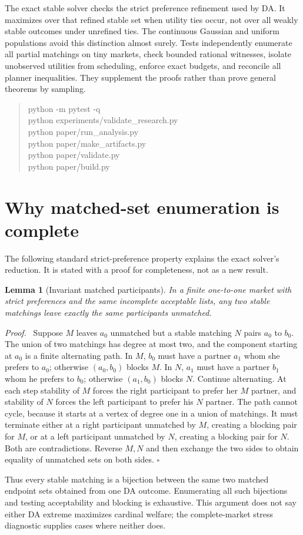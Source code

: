 \documentclass[11pt,a4paper]{article}
\newtheorem{lemma}{Lemma}
\newenvironment{proof}{\par\noindent\textit{Proof.}\ }{\hfill$\square$\par}
\begin{document}
The exact stable solver checks the strict preference refinement used by DA. It maximizes over that refined stable set when utility ties occur, not over all weakly stable outcomes under unrefined ties. The continuous Gaussian and uniform populations avoid this distinction almost surely. Tests independently enumerate all partial matchings on tiny markets, check bounded rational witnesses, isolate unobserved utilities from scheduling, enforce exact budgets, and reconcile all planner inequalities. They supplement the proofs rather than prove general theorems by sampling.

\begin{quote}\small\ttfamily
python -m pytest -q\\
python experiments/validate\_research.py\\
python paper/run\_analysis.py\\
python paper/make\_artifacts.py\\
python paper/validate.py\\
python paper/build.py
\end{quote}

\section{Why matched-set enumeration is complete}\label{app:matched}
The following standard strict-preference property explains the exact solver's
reduction. It is stated with a proof for completeness, not as a new result.
\begin{lemma}[Invariant matched participants]
In a finite one-to-one market with strict preferences and the same incomplete
acceptable lists, any two stable matchings leave exactly the same participants
unmatched.
\end{lemma}
\begin{proof}
Suppose $M$ leaves $a_0$ unmatched but a stable matching $N$ pairs $a_0$ to $b_0$.
The union of two matchings has degree at most two, and the component starting
at $a_0$ is a finite alternating path. In $M$, $b_0$ must have a partner $a_1$
whom she prefers to $a_0$; otherwise $(a_0,b_0)$ blocks $M$. In $N$, $a_1$
must have a partner $b_1$ whom he prefers to $b_0$; otherwise $(a_1,b_0)$ blocks
$N$. Continue alternating. At each step stability of $M$ forces the right
participant to prefer her $M$ partner, and stability of $N$ forces the left
participant to prefer his $N$ partner. The path cannot cycle, because it starts
at a vertex of degree one in a union of matchings. It must terminate either
at a right participant unmatched by $M$, creating a blocking pair for $M$,
or at a left participant unmatched by $N$, creating a blocking pair for $N$.
Both are contradictions. Reverse $M,N$ and then exchange the two sides to
obtain equality of unmatched sets on both sides.
\end{proof}
Thus every stable matching is a bijection between the same two matched
endpoint sets obtained from one DA outcome. Enumerating all such bijections
and testing acceptability and blocking is exhaustive. This argument does not
say either DA extreme maximizes cardinal welfare; the complete-market stress
diagnostic supplies cases where neither does.
\end{document}
